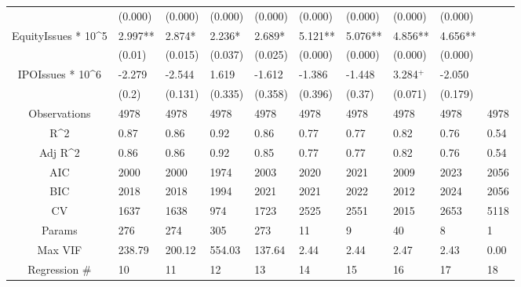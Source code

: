 \documentclass{article}
\begin{document}
\begin{table}[H]
\begin{tabular}{|clllllllll|}
   & (0.000) & (0.000) & (0.000) & (0.000) & (0.000) & (0.000) & (0.000) & (0.000) &  \\ 
  EquityIssues * 10^5 & 2.997** & 2.874* & 2.236* & 2.689* & 5.121** & 5.076** & 4.856** & 4.656** &  \\ 
   & (0.01) & (0.015) & (0.037) & (0.025) & (0.000) & (0.000) & (0.000) & (0.000) &  \\ 
  IPOIssues * 10^6 & -2.279 & -2.544 & 1.619 & -1.612 & -1.386 & -1.448 & 3.284$^{+}$ & -2.050 &  \\ 
   & (0.2) & (0.131) & (0.335) & (0.358) & (0.396) & (0.37) & (0.071) & (0.179) &  \\ 
  \hline 
 Observations & 4978 & 4978 & 4978 & 4978 & 4978 & 4978 & 4978 & 4978 & 4978 \\ 
  R^2 & 0.87 & 0.86 & 0.92 & 0.86 & 0.77 & 0.77 & 0.82 & 0.76 & 0.54 \\ 
  Adj R^2 & 0.86 & 0.86 & 0.92 & 0.85 & 0.77 & 0.77 & 0.82 & 0.76 & 0.54 \\ 
  AIC & 2000 & 2000 & 1974 & 2003 & 2020 & 2021 & 2009 & 2023 & 2056 \\ 
  BIC & 2018 & 2018 & 1994 & 2021 & 2021 & 2022 & 2012 & 2024 & 2056 \\ 
  CV & 1637 & 1638 & 974 & 1723 & 2525 & 2551 & 2015 & 2653 & 5118 \\ 
  Params & 276 & 274 & 305 & 273 & 11 & 9 & 40 & 8 & 1 \\ 
  Max VIF & 238.79 & 200.12 & 554.03 & 137.64 & 2.44 & 2.44 & 2.47 & 2.43 & 0.00 \\ 
  Regression \# & 10 & 11 & 12 & 13 & 14 & 15 & 16 & 17 & 18 \\ 
   \hline
\end{tabular}
 
\end{table}
\end{document}
